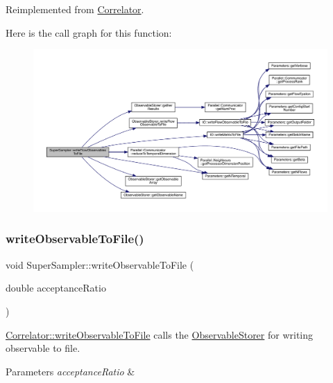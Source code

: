 Reimplemented from \mbox{\hyperlink{class_correlator_a168512b2ce182d9478db47f100125fa6}{Correlator}}.

Here is the call graph for this function\+:\nopagebreak
\begin{figure}[H]
\begin{center}
\leavevmode
\includegraphics[width=350pt]{class_super_sampler_a410b650ebccdb03519c88908a3a8013e_cgraph}
\end{center}
\end{figure}
\mbox{\label{class_super_sampler_a05b42b82879233dc329d280a61bfd7f0}} 
\subsubsection{\texorpdfstring{writeObservableToFile()}{writeObservableToFile()}}
{\footnotesize\ttfamily void Super\+Sampler\+::write\+Observable\+To\+File (\begin{DoxyParamCaption}\item[{double}]{acceptance\+Ratio }\end{DoxyParamCaption})\hspace{0.3cm}{\ttfamily [virtual]}}



\mbox{\hyperlink{class_correlator_a9e8d80e30e4fbe3b7fe57521538cb5ff}{Correlator\+::write\+Observable\+To\+File}} calls the \mbox{\hyperlink{class_observable_storer}{Observable\+Storer}} for writing observable to file. 


\begin{DoxyParams}{Parameters}
{\em acceptance\+Ratio} & \\
\hline
\end{DoxyParams}



